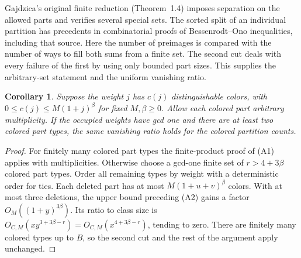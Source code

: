 \documentclass[11pt,a4paper]{article}
\newtheorem{corollary}[theorem]{Corollary}
\numberwithin{equation}{section}
\begin{document}
Gajdzica's original finite reduction (Theorem~1.4) imposes separation
on the allowed parts and verifies several special sets. The sorted split
of an individual partition has precedents in combinatorial proofs of
Bessenrodt--Ono inequalities, including that source. Here the number
of preimages is compared with the number of ways to fill both sums
from a finite set. The second cut deals with every failure of the
first by using only bounded part sizes. This supplies the arbitrary-set
statement and the uniform vanishing ratio.

\begin{corollary}\label{th:arbitrary-colored}
Suppose the weight $j$ has $c(j)$ distinguishable colors, with
$0\le c(j)\le M(1+j)^\beta$ for fixed $M,\beta\ge0$.
Allow each colored part arbitrary multiplicity. If the occupied
weights have gcd one and there are at least two colored part types,
the same vanishing ratio holds for the colored partition counts.
\end{corollary}
\begin{proof}
For finitely many colored part types the finite-product proof of
(A1) applies with multiplicities. Otherwise choose a gcd-one finite
set of $r>4+3\beta$ colored part types. Order all remaining types by
weight with a deterministic order for ties. Each deleted part has
at most $M(1+u+v)^\beta$ colors. With at most three deletions, the
upper bound preceding (A2) gains a factor $O_M((1+y)^{3\beta})$.
Its ratio to class size is $O_{C,M}(x y^{3+3\beta-r})
=O_{C,M}(x^{4+3\beta-r})$, tending to zero. There are finitely
many colored types up to $B$, so the second cut and the rest of the
argument apply unchanged.
\end{proof}
\end{document}
